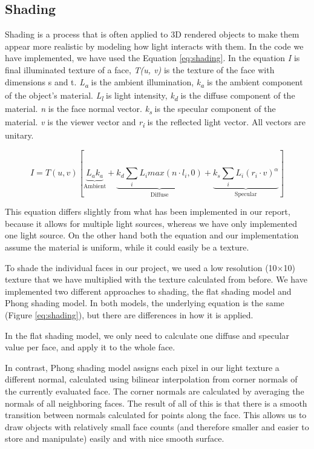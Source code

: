 \subsection{Shading}

Shading is a process that is often applied to 3D rendered objects to make them appear more realistic by modeling  how light interacts with them. In the code we have implemented, we have used the Equation \ref{eq:shading}. In the equation \textit{I} is final illuminated texture of a face, \textit{T(u, v)} is the texture of the face with dimensions s and t. \textit{L\textsubscript{a}} is the ambient illumination, \textit{k\textsubscript{a}} is the ambient component of the object's material. \textit{L\textsubscript{l}} is light intensity, \textit{k\textsubscript{d}} is the diffuse component of the material. \textit{n} is the face normal vector. \textit{k\textsubscript{s}} is the specular component of the material. \textit{v} is the viewer vector and \textit{r\textsubscript{i}} is the reflected light vector. All vectors are unitary.

\begin{equation}
	I=T(u,v)[
	\underbrace{
	L_{a}k_{a}
	}_\text{Ambient}
	+
	\underbrace{
	k_{d}\sum\limits_{i}L_{i}max(n\cdot l_{i},0)
	}_\text{Diffuse}
	+
	\underbrace{
	k_{s}\sum\limits_{i}L_{i}(r_{i}\cdot v)^\alpha
	  }_\text{Specular}
	]
	\label{eq:shading}
\end{equation}

This equation differs slightly from what has been implemented in our report, because it allows for multiple light sources, whereas we have only implemented one light source. On the other hand both the equation and our implementation assume the material is uniform, while it could easily be a texture.

To shade the individual faces in our project, we used a low resolution (10$\times$10) texture that we have multiplied with the texture calculated from before. We have implemented two different approaches to shading, the flat shading model and Phong shading model. In both models, the underlying equation is the same (Figure \ref{eq:shading}), but there are differences in how it is applied.

In the flat shading model, we only need to calculate one diffuse and specular value per face, and apply it to the whole face.

In contrast, Phong shading model assigns each pixel in our light texture a different normal, calculated using bilinear interpolation from corner normals of the currently evaluated face. The corner normals are calculated by averaging the normals of all neighboring faces. The result of all of this is that there is a smooth transition between normals calculated for points along the face. This allows us to draw objects with relatively small face counts (and therefore smaller and easier to store and manipulate) easily and with nice smooth surface. 

